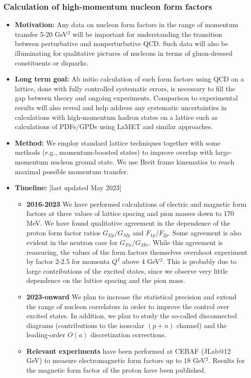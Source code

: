 \documentclass[12pt,hyperpdf]{article}
\begin{document}
\subsubsection{Calculation of high-momentum nucleon form factors}
\begin{itemize}
    \item{\bf Motivation:} Any data on nucleon form factors in the range of momentum transfer 5-20 GeV$^2$ will be important for understanding the transition between perturbative and nonperturbative QCD. Such data will also be illuminating for qualitative pictures of nucleons in terms of gluon-dressed constituents or diquarks.
    \item{\bf Long term goal:} Ab initio calculation of such form factors using QCD on a lattice, done with fully controlled systematic errors, is necessary to fill the gap between theory and ongoing experiments. Comparison to experimental results will also reveal and help address any systematic uncertainties in calculations with high-momentum hadron states on a lattice such as calculations of PDFs/GPDs using LaMET and similar approaches.
    \item{\bf Method:} We employ standard lattice techniques together with some methods (e.g., momentum-boosted states) to improve overlap with large-momentum nucleon ground state. We use Breit frame kinematics to reach maximal possible momentum transfer.
\item{\bf Timeline:} \hfill [last updated May 2023]
\begin{itemize}
    \item{\bf 2016-2023} We have performed calculations of electric and magnetic form factors at three values of lattice spacing and pion masses down to 170 MeV. We have found qualitative agreement in the dependence of the proton form factor ratios $G_{Ep}/G_{Mp}$ and $F_{1p}/F_{2p}$. Some agreement is also evident in the neutron case for $G_{En}/G_{Mn}$. While this agreement is reassuring, the values of the form factors themselves overshoot experiment by factor 2-2.5 for momenta $Q^2$ above 4 GeV$^2$. This is probably due to large contributions of the excited states, since we observe very little dependence on the lattice spacing and the pion mass.
    \item{\bf 2023-onward} We plan to increase the statistical precision and extend the range of nucleon correlators in order to improve the control over excited states. In addition, we plan to study the so-called disconnected diagrams (contributions to the isoscalar $(p+n)$ channel) and the leading-order $O(a)$ discretization corrections.
    \item{\bf Relevant experiments} have been performed at CEBAF (JLab@12 GeV) to measure electromagnetic form factors up to 18 GeV$^2$. Results for the magnetic form factor of the proton have been published.
\end{itemize}
\end{itemize}
\end{document}
